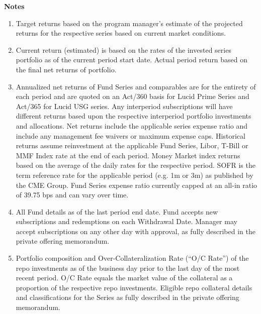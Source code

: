 \documentclass[9pt]{article}
\begin{document}
\onecolumn



\pagebreak 

\footnotesize
\noindent\textbf{\color{lucid_blue}Notes}

\begin{enumerate}
\item Target returns based on the program manager's estimate of the projected returns for the respective series based on current market conditions. 

\item Current return (estimated) is based on the rates of the invested series portfolio as of the current period start date.  Actual period return based on the final net returns of portfolio.   

\item Annualized net returns of Fund Series and comparables are for the entirety of each period and are quoted on an Act/360 basis for Lucid Prime Series and Act/365 for Lucid USG series. Any interperiod subscriptions will have different returns based upon the respective interperiod portfolio investments and allocations. Net returns include the applicable series expense ratio and include any management fee waivers or maximum expense caps. Historical returns assume reinvestment at the applicable Fund Series, Libor, T-Bill or MMF Index rate at the end of each period.  Money Market index returns based on the average of the daily rates for the respective period. SOFR is the term reference rate for the applicable period (e.g. 1m or 3m) as published by the CME Group. Fund Series expense ratio currently capped at an all-in ratio of 39.75 bps and can vary over time.

\item All Fund details as of the last period end date. Fund accepts new subscriptions and redemptions on each Withdrawal Date.  Manager may accept subscriptions on any other day with approval, as fully described in the private offering memorandum.

\item Portfolio composition and Over-Collateralization Rate (``O/C Rate'') of the repo investments as of the business day prior to the last day of the most recent period. O/C Rate equals the market value of the collateral as a proportion of the respective repo investments. Eligible repo collateral details and classifications for the Series as fully described in the private offering memorandum.

\end{enumerate}
\end{document}
